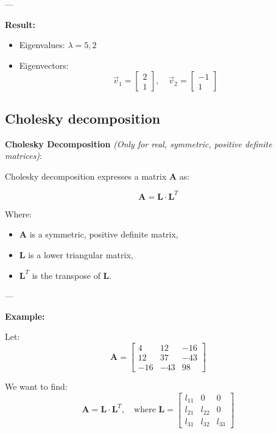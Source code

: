---

\textbf{Result:}
\begin{itemize}
    \item Eigenvalues: \(\lambda = 5, 2\)
    \item Eigenvectors: 
    \[
    \vec{v}_1 = 
    \begin{bmatrix}
    2 \\
    1
    \end{bmatrix},
    \quad
    \vec{v}_2 = 
    \begin{bmatrix}
    -1 \\
    1
    \end{bmatrix}
    \]
\end{itemize}


\subsection{Cholesky decomposition}

\textbf{Cholesky Decomposition} \textit{(Only for real, symmetric, positive definite matrices)}:

Cholesky decomposition expresses a matrix \(\textbf{A}\) as:

\[
\textbf{A} = \textbf{L} \cdot \textbf{L}^T
\]

Where:
\begin{itemize}
    \item \(\textbf{A}\) is a symmetric, positive definite matrix,
    \item \(\textbf{L}\) is a lower triangular matrix,
    \item \(\textbf{L}^T\) is the transpose of \(\textbf{L}\).
\end{itemize}

---

\textbf{Example:}

Let:
\[
\textbf{A} =
\begin{bmatrix}
4 & 12 & -16 \\
12 & 37 & -43 \\
-16 & -43 & 98
\end{bmatrix}
\]

We want to find:
\[
\textbf{A} = \textbf{L} \cdot \textbf{L}^T, \quad \text{where } 
\textbf{L} =
\begin{bmatrix}
l_{11} & 0 & 0 \\
l_{21} & l_{22} & 0 \\
l_{31} & l_{32} & l_{33}
\end{bmatrix}
\]

